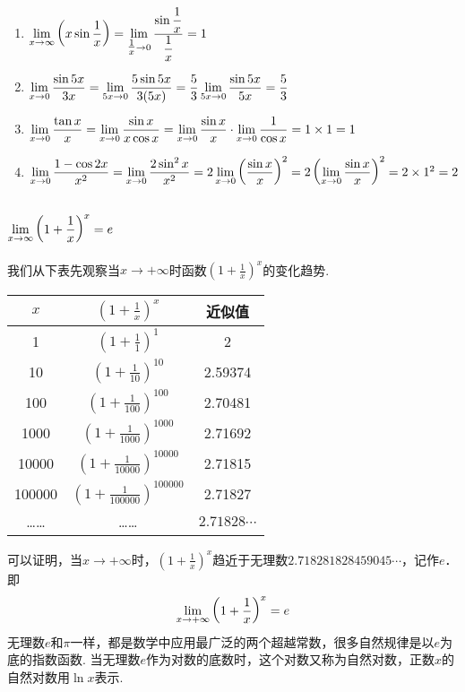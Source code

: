 \begin{solution}
\begin{enumerate}[(1)]
    \item $\lim\limits_{x\to \infty}\left(x\sin\dfrac{1}{x}\right)=\lim\limits_{\tfrac{1}{x}\to 0}\dfrac{\sin\dfrac{1}{x}}{\dfrac{1}{x}}=1$
    \item $\lim\limits_{x\to 0}\dfrac{\sin 5x}{3x}=\lim\limits_{5x\to 0}\dfrac{5\sin 5x}{3(5x)}=\dfrac{5}{3}\lim\limits_{5x\to 0}\dfrac{\sin 5x}{5x}=\dfrac{5}{3}$
    \item $\lim\limits_{x\to 0}\dfrac{\tan x}{x}=\lim\limits_{x\to 0}\dfrac{\sin x}{x\cos x}=\lim\limits_{x\to 0}\dfrac{\sin x}{x}\cdot \lim\limits_{x\to 0}\dfrac{1}{\cos x}=1\times 1=1$
    \item $\lim\limits_{x\to 0}\dfrac{1-\cos 2x}{x^2}=\lim\limits_{x\to 0}\dfrac{2\sin^2 x}{x^2}=2\lim\limits_{x\to 0}\left(\dfrac{\sin x}{x}\right)^2=2\left(\lim\limits_{x\to 0}\dfrac{\sin x}{x}\right)^2=2\times 1^2=2$
\end{enumerate}
\end{solution}

\subsection{$\lim\limits_{x\to \infty}\left(1+\dfrac{1}{x}\right)^x=e$}
我们从下表先观察当$x\to +\infty$时函数$\left(1+\frac{1}{x}\right)^x$的变化趋势.

\begin{center}
\begin{tabular}{ccc}
\hline
    $x$ & $\left(1+\frac{1}{x}\right)^x$ & 近似值\\
\hline
1   &  $\left(1+\frac{1}{1}\right)^1$ & 2\\
10   &  $\left(1+\frac{1}{10}\right)^{10}$ &2.59374\\
100   &  $\left(1+\frac{1}{100}\right)^{100}$ &2.70481\\
1000   &  $\left(1+\frac{1}{1000}\right)^{1000}$ &2.71692\\
10000   &  $\left(1+\frac{1}{10000}\right)^{10000}$ &2.71815\\
100000   &  $\left(1+\frac{1}{100000}\right)^{100000}$ &2.71827\\
……&……& $2.71828\cdots$\\
\hline
\end{tabular}
\end{center}


可以证明，当$x\to +\infty$时，$\left(1+\frac{1}{x}\right)^x$趋近于无理数$2.718281828459045\cdots$，记作$e$．即
\[\lim\limits_{x\to +\infty}\left(1+\dfrac{1}{x}\right)^x=e\]
无理数$e$和$\pi$一样，都是数学中应用最广泛的两个超越常数，很多自然规律是以$e$为底的指数函数. 当无理数$e$作为对数的底数时，这个对数又称为自然对数，正数$x$的自然对数用$\ln x$表示.

